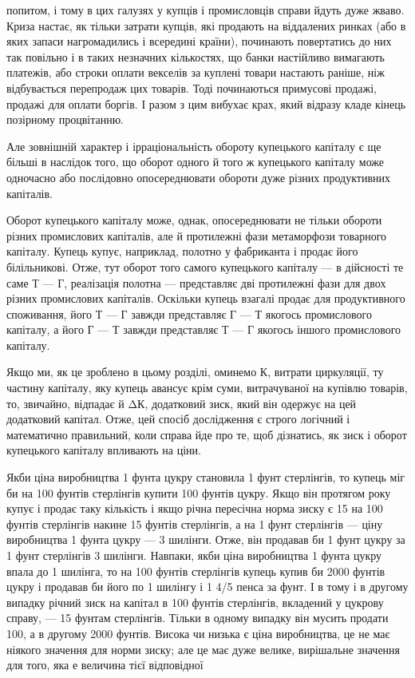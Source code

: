 попитом, і тому в цих галузях у купців і промисловців справи
йдуть дуже жваво. Криза настає, як тільки затрати купців, які
продають на віддалених ринках (або в яких запаси нагромадились
і всередині країни), починають повертатись до них так
повільно і в таких незначних кількостях, що банки настійливо
вимагають платежів, або строки оплати векселів за куплені
товари настають раніше, ніж відбувається перепродаж цих
товарів. Тоді починаються примусові продажі, продажі для
оплати боргів. І разом з цим вибухає крах, який відразу кладе
кінець позірному процвітанню.

Але зовнішній характер і ірраціональність обороту купецького
капіталу є ще більші в наслідок того, що оборот одного й того ж
купецького капіталу може одночасно або послідовно опосереднювати
обороти дуже різних продуктивних капіталів.

Оборот купецького капіталу може, однак, опосереднювати
не тільки обороти різних промислових капіталів, але й протилежні
фази метаморфози товарного капіталу. Купець купує,
наприклад, полотно у фабриканта і продає його білільникові.
Отже, тут оборот того самого купецького капіталу — в дійсності
те саме Т — Г, реалізація полотна — представляє дві протилежні
фази для двох різних промислових капіталів. Оскільки
купець взагалі продає для продуктивного споживання, його
Т — Г завжди представляє Г — Т якогось промислового капіталу,
а його Г — Т завжди представляє Т — Г якогось іншого промислового
капіталу.

Якщо ми, як це зроблено в цьому розділі, оминемо К, витрати
циркуляції, ту частину капіталу, яку купець авансує крім
суми, витрачуваної на купівлю товарів, то, звичайно, відпадає
й ΔК, додатковий зиск, який він одержує на цей додатковий
капітал. Отже, цей спосіб дослідження є строго логічний і математично
правильний, коли справа йде про те, щоб дізнатись,
як зиск і оборот купецького капіталу впливають на ціни.

Якби ціна виробництва 1 фунта цукру становила 1 фунт
стерлінгів, то купець міг би на 100 фунтів стерлінгів купити
100 фунтів цукру. Якщо він протягом року купує і продає таку
кількість і якщо річна пересічна норма зиску є 15%
на 100 фунтів стерлінгів накине 15 фунтів стерлінгів, а на
1 фунт стерлінгів — ціну виробництва 1 фунта цукру — 3 шилінги.
Отже, він продавав би 1 фунт цукру за 1 фунт стерлінгів 3 шилінги.
Навпаки, якби ціна виробництва 1 фунта цукру впала до
1 шилінга, то на 100 фунтів стерлінгів купець купив би 2000 фунтів
цукру і продавав би його по 1 шилінгу і 1 4/5 пенса за фунт.
І в тому і в другому випадку річний зиск на капітал в 100 фунтів
стерлінгів, вкладений у цукрову справу, — 15 фунтам стерлінгів.
Тільки в одному випадку він мусить продати 100, а в другому
2000 фунтів. Висока чи низька є ціна виробництва, це не має
ніякого значення для норми зиску; але це має дуже велике,
вирішальне значення для того, яка е величина тієї відповідної
